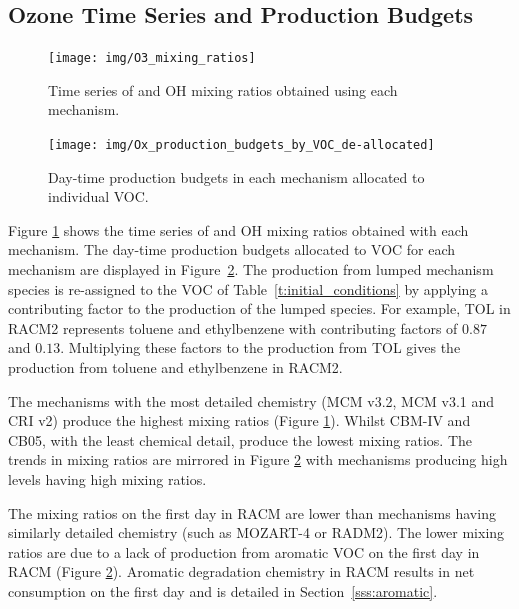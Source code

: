 
\subsection[Ozone Time Series and Ox Production Budgets]{Ozone Time Series and  Production Budgets} \label{ss:O3_time_series}

\begin{figure}
    \centering
    \texttt{[image: img/O3\_mixing\_ratios]}
    \vspace{1mm}
    \caption{Time series of  and OH mixing ratios obtained using each mechanism.}
    \vspace{-4mm}
    \label{f:time_series}
\end{figure}

\begin{figure}
    \centering
    \texttt{[image: img/Ox\_production\_budgets\_by\_VOC\_de-allocated]}
    \vspace{1mm}
    \caption{Day-time  production budgets in each mechanism allocated to individual VOC.}
    \vspace{-4mm}
    \label{f:Ox_tagged_budgets}
\end{figure}

Figure \ref{f:time_series} shows the time series of  and OH mixing ratios obtained with each mechanism.
The day-time  production budgets allocated to VOC for each mechanism are displayed in \mbox{Figure \ref{f:Ox_tagged_budgets}}.
The  production from lumped mechanism species is re-assigned to the VOC of \mbox{Table \ref{t:initial_conditions}} by applying a contributing factor to the  production of the lumped species.
For example, TOL in RACM2 represents toluene and ethylbenzene with contributing factors of $0.87$ and $0.13$.
Multiplying these factors to the  production from TOL gives the  production from toluene and ethylbenzene in RACM2.

The mechanisms with the most detailed chemistry (MCM v3.2, MCM v3.1 and CRI v2) produce the highest  mixing ratios (Figure \ref{f:time_series}).
Whilst CBM-IV and CB05, with the least chemical detail, produce the lowest  mixing ratios.
The trends in  mixing ratios are mirrored in Figure \ref{f:Ox_tagged_budgets} with mechanisms producing high  levels having high  mixing ratios.

The  mixing ratios on the first day in RACM are lower than mechanisms having similarly detailed chemistry (such as MOZART-4 or RADM2).
The lower  mixing ratios are due to a lack of  production from aromatic VOC on the first day in RACM (Figure \ref{f:Ox_tagged_budgets}).
Aromatic degradation chemistry in RACM results in net  consumption on the first day and is detailed in \mbox{Section \ref{sss:aromatic}}.

